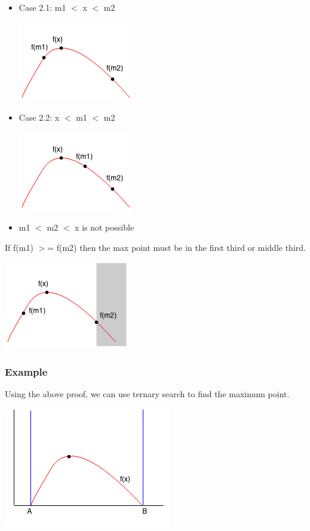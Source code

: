 \documentclass[11pt,oneside]{book}
\makeatletter
\def\maxwidth#1{\ifdim\Gin@nat@width>#1 #1\else\Gin@nat@width\fi}
\makeatother
\begin{document}
\begin{itemize}
\item Case 2.1: m1 $<$ x $<$ m2

\includegraphics[width=\maxwidth{\textwidth}]{ternarycase21.png}
\item Case 2.2: x $<$ m1 $<$ m2

\includegraphics[width=\maxwidth{\textwidth}]{ternarycase22.png}
\item m1 $<$ m2 $<$ x is not possible
\end{itemize}

If f(m1) $>$= f(m2) then the max point must be in the first third or middle third.

\includegraphics[width=\maxwidth{\textwidth}]{ternarycase2.png}

\subsubsection{Example}

Using the above proof, we can use ternary search to find the maximum point.

\includegraphics[width=\maxwidth{\textwidth}]{ternarysearch.png}
\end{document}

